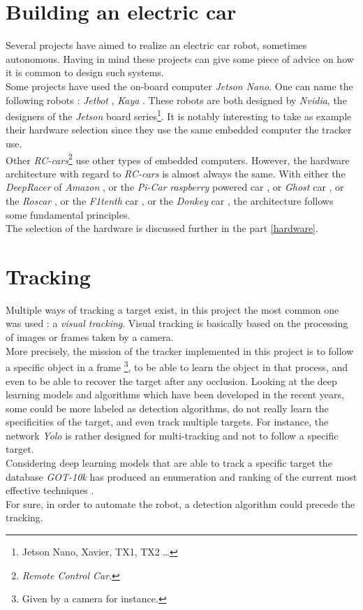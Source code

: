 		\section{Building an electric car}
		
		Several projects have aimed to realize an electric car robot, sometimes autonomous. 
		Having in mind these projects can give some piece of advice on how it is common 
		to design such systems.
		\\\indent Some projects have used the on-board computer \textit{Jetson Nano}. 
		One can name the following robots : \textit{Jetbot} \cite{jetbot}, \textit{Kaya} \cite{kaya}.
		These robots are both designed by \textit{Nvidia}, the designers of the 
		\textit{Jetson} board series\footnote{Jetson Nano, Xavier, TX1, TX2 \dots}. It 
		is notably interesting to take as example their hardware selection since they
		use the same embedded computer the tracker use.
		\\\indent Other \textit{RC-cars}\footnote{\textit{Remote Control Car}.} use other types of embedded computers.
		However, the hardware architecture with regard to \textit{RC-cars} is 
		almost always the same. With either the \textit{DeepRacer} of \textit{Amazon} \cite{deepracer}, or
		the \textit{Pi-Car} \textit{raspberry} powered car \cite{rasp}, or 
		\textit{Ghost} car \cite{ghost}, or the \textit{Roscar} \cite{roscar}, or
		the \textit{F1tenth} car \cite{f1tenth}, or the \textit{Donkey} car \cite{donkey}, the architecture
		follows some fundamental principles.
		\\\indent The selection of the hardware is discussed further in the part \vref{hardware}.
		
		\section{Tracking}
		
		Multiple ways of tracking a target exist, in this project the most
		common one was used : a \textit{visual tracking}. Visual tracking
		is basically based on the processing of images or frames taken by a camera. 
		\\\indent More precisely, the mission of the tracker implemented
		in this project is to follow
		a specific object in a frame
		\footnote{Given by a camera for instance.}, to be able to 
		learn the object in that process, and even to be able to recover the target after 
		any occlusion. Looking at the deep learning models and algorithms 
		which have been developed in the recent years,
		some could be more labeled as detection algorithms, do not really learn the specificities 
		of the target, and even track multiple targets. For instance, the network \textit{Yolo} 
		\cite{bjelonicYolo2018} is rather designed for multi-tracking and 		not to follow a specific target. 
		\\\indent Considering deep learning models that are able to 
		track a specific target the database \textit{GOT-10k} has produced
		an enumeration and ranking of the current most effective techniques \cite{trakinglist}.
		\\\indent For sure, in order to automate the robot, a detection algorithm
		could precede the tracking.
		 
